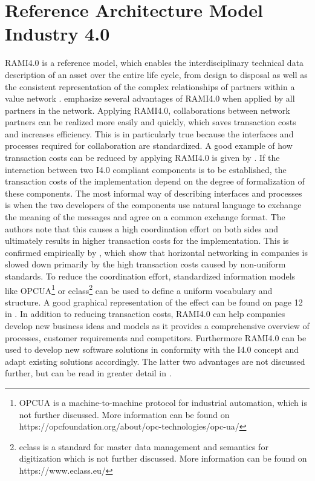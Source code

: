 \section{Reference Architecture Model Industry 4.0} \label{sec:rami40}
\ac{RAMI4.0} is a reference model, which enables the interdisciplinary technical data description of an asset over the entire life cycle, from design to disposal as well as the consistent representation of the complex relationships of partners within a value network \cite[p. 4]{Heidel2017ReferenzarchitekturmodellIndustrie4.0Komponente}. \citet[p. 23]{Arnold2018DigitaleMittelstand} emphasize several advantages of \ac{RAMI4.0} when applied by all partners in the network. Applying \ac{RAMI4.0}, collaborations between network partners can be realized more easily and quickly, which saves transaction costs and increases efficiency. This is in particularly true because the interfaces and processes required for collaboration are standardized. A good example of how transaction costs can be reduced by applying \ac{RAMI4.0} is given by \citet[p. 11]{Bayha2020DescribingComponents}. If the interaction between two \ac{I4.0} compliant components is to be established, the transaction costs of the implementation depend on the degree of formalization of these components. The most informal way of describing interfaces and processes is when the two developers of the components use natural language to exchange the meaning of the messages and agree on a common exchange format. The authors note that this causes a high coordination effort on both sides and ultimately results in higher transaction costs for the implementation. This is confirmed empirically by \citet[p. 14]{Arnold2018DigitaleMittelstand}, which show that horizontal networking in companies is slowed down primarily by the high transaction costs caused by non-uniform standards. To reduce the coordination effort, standardized information models like \ac{OPCUA}\footnote{\ac{OPCUA} is a machine-to-machine protocol for industrial automation, which is not further discussed. More information can be found on https://opcfoundation.org/about/opc-technologies/opc-ua/} or eclass\footnote{eclass is a standard for master data management and semantics for digitization which is not further discussed. More information can be found on https://www.eclass.eu/} can be used to define a uniform vocabulary and structure. A good graphical representation of the effect can be found on page 12 in \citet{Bayha2020DescribingComponents}. In addition to reducing transaction costs, \ac{RAMI4.0} can help companies develop new business ideas and models as it provides a comprehensive overview of processes, customer requirements and competitors. Furthermore \ac{RAMI4.0} can be used to develop new software solutions in conformity with the \ac{I4.0} concept and adapt existing solutions accordingly. The latter two advantages are not discussed further, but can be read in greater detail in \citet[p. 24 ff]{Arnold2018DigitaleMittelstand}.

